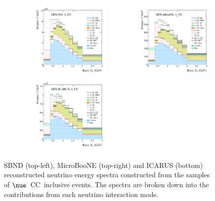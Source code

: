 \begin{figure}[h!]
  {\includegraphics[width=0.49\textwidth]{figures-chap6/spectra/nue_nominal_spectrum_sbn_nd_BNB_FHC_0_modes.pdf}}
  {\includegraphics[width=0.49\textwidth]{figures-chap6/spectra/nue_nominal_spectrum_sbn_uboone_BNB_FHC_1_modes.pdf}}
  {\includegraphics[width=0.49\textwidth]{figures-chap6/spectra/nue_nominal_spectrum_sbn_icarus_BNB_FHC_2_modes.pdf}}
  \captionsetup{width=0.49\textwidth}
  \parbox[b]{0.49\textwidth}%
  {
    \caption[SBN \nue CC inclusive reconstructed neutrino energy spectra.]{SBND (top-left), MicroBooNE (top-right) and ICARUS (bottom)
    reconstructed neutrino energy spectra constructed from the samples of $\nue$~CC~inclusive events. The spectra are broken down into the
    contributions from each neutrino interaction mode.\\ \phantom{.}\\}
    \label{fig:nominal_nue_spectra} 
  }
\end{figure}


